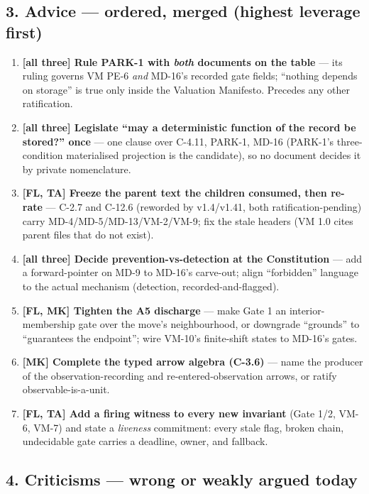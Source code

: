 \documentclass[11pt,a4paper]{article}
\begin{document}
\subsection*{3. Advice --- ordered, merged (highest leverage first)}

\begin{enumerate}\setlength{\itemsep}{0pt}
  \item \textbf{[all three] Rule PARK-1 with \emph{both} documents on the table} --- its ruling
  governs VM PE-6 \emph{and} MD-16's recorded gate fields; ``nothing depends on storage'' is
  true only inside the Valuation Manifesto. Precedes any other ratification.
  \item \textbf{[all three] Legislate ``may a deterministic function of the record be stored?''
  once} --- one clause over C-4.11, PARK-1, MD-16 (PARK-1's three-condition materialised
  projection is the candidate), so no document decides it by private nomenclature.
  \item \textbf{[FL, TA] Freeze the parent text the children consumed, then re-rate} --- C-2.7
  and C-12.6 (reworded by v1.4/v1.41, both ratification-pending) carry MD-4/MD-5/MD-13/VM-2/VM-9;
  fix the stale headers (VM 1.0 cites parent files that do not exist).
  \item \textbf{[all three] Decide prevention-vs-detection at the Constitution} --- add a
  forward-pointer on MD-9 to MD-16's carve-out; align ``forbidden'' language to the actual
  mechanism (detection, recorded-and-flagged).
  \item \textbf{[FL, MK] Tighten the A5 discharge} --- make Gate 1 an interior-membership gate
  over the move's neighbourhood, or downgrade ``grounds'' to ``guarantees the endpoint''; wire
  VM-10's finite-shift states to MD-16's gates.
  \item \textbf{[MK] Complete the typed arrow algebra (C-3.6)} --- name the producer of the
  observation-recording and re-entered-observation arrows, or ratify observable-is-a-unit.
  \item \textbf{[FL, TA] Add a firing witness to every new invariant} (Gate 1/2, VM-6, VM-7) and
  state a \emph{liveness} commitment: every stale flag, broken chain, undecidable gate carries a
  deadline, owner, and fallback.
\end{enumerate}

\subsection*{4. Criticisms --- wrong or weakly argued today}
\end{document}
